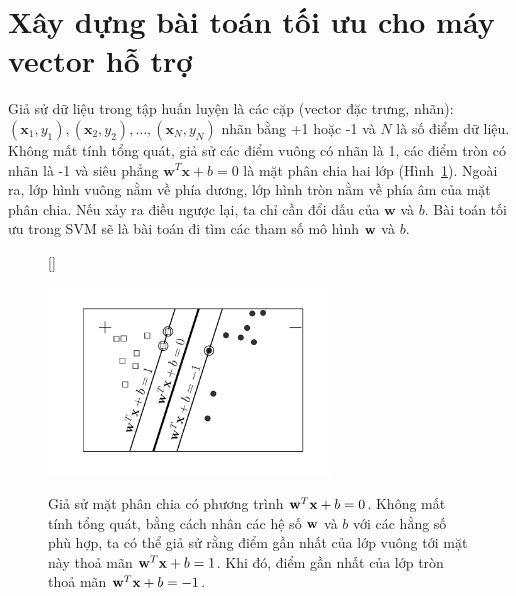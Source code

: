 \section{Xây dựng bài toán tối ưu cho máy vector hỗ trợ}
Giả sử dữ liệu trong tập huấn luyện là các cặp (vector đặc trưng, nhãn): $(\mathbf{x}_1, y_1),
(\mathbf{x}_2, y_2), \dots, (\mathbf{x}_N, y_N)$
{nhãn} bằng +1 hoặc -1 và $N$ là số điểm dữ liệu.
Không mất tính tổng quát, giả sử các điểm vuông có nhãn là 1, các điểm tròn có nhãn là -1 và siêu phẳng $\mathbf{w}^T\mathbf{x} + b  = 0$ là mặt phân chia hai lớp (Hình~\ref{fig:svmf3}). Ngoài ra, lớp hình vuông nằm về {phía
dương}, lớp hình tròn nằm về {phía âm} của mặt phân chia. Nếu  xảy ra điều ngược lại, ta
chỉ cần đổi dấu của $\mathbf{w}$ và $b$. Bài toán tối ưu trong SVM sẽ là bài toán đi tìm các tham số mô hình $\mathbf{w}$ và $b$.
\begin{figure}[t]
[\FBwidth]
{\caption{Giả sử mặt phân chia có phương trình $\mathbf{w}^T\mathbf{x}+b = 0$. Không mất
tính tổng quát, bằng cách nhân các hệ số $\mathbf{w}$ và $b$ với các hằng số phù
hợp, ta có thể giả sử rằng điểm gần nhất của lớp vuông tới
mặt này thoả mãn $\mathbf{w}^T\mathbf{x} + b = 1$. Khi đó, điểm gần nhất của lớp tròn
thoả mãn $\mathbf{w}^T\mathbf{x} + b = -1$.}
\label{fig:svmf3}}
{\includegraphics[width=7.5cm]{ebookML_src/src/svm/svm3.pdf}}
\end{figure}

